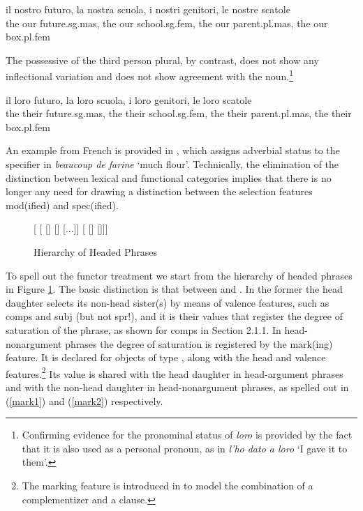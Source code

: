 \documentclass[output=paper]{langsci/langscibook}
\begin{document}
\begin{exe}  
\ex 
\gll  il nostro futuro, la nostra scuola, i nostri genitori, le nostre scatole \\
      the our future.{\sc sg.mas}, the our school.{\sc sg.fem}, the our parent.{\sc pl.mas}, the our box.{\sc pl.fem} \\ 
\end{exe} 

\noindent
The possessive of the third person plural, by contrast, does not show any 
inflectional variation and does not show agreement with the 
noun.\footnote{Confirming evidence for the pronominal status of \emph{loro} is 
provided by the fact that it is also used as a personal pronoun, as in 
\emph{l'ho dato a loro} `I gave it to them'.}

\begin{exe} 
\ex 
\gll  il loro futuro, la loro scuola, i loro genitori, le loro scatole \\   
      the their future.{\sc sg.mas}, the their school.{\sc sg.fem}, the their parent.{\sc pl.mas}, the their box.{\sc pl.fem} \\ 
\end{exe}

\noindent
An example from French is provided in \citet{Abeilleetal04}, 
which assigns adverbial status to the specifier in 
\emph{beaucoup de farine} `much flour'.  
Technically, the elimination of the distinction between lexical and 
functional categories implies that there is no longer any need for 
drawing a distinction between the selection features {\sc mod(ified)} and {\sc spec(ified)}. 

\begin{figure}
	\centering
	\begin{forest}
[
	[
		[]
		[]
		[...]]
	[
		[]
		[]]]	
	\end{forest}
	\caption{\label{typ} Hierarchy of Headed Phrases}
\end{figure}

To spell out the functor treatment we start from the 
hierarchy of headed phrases in Figure \ref{typ}. The basic distinction is
that between  and . 
In the former the head daughter selects its non-head sister(s) by means of 
valence features, such as {\sc comps} and {\sc subj} (but not {\sc spr}!), 
and it is their values that register the degree of saturation of the phrase, 
as shown for {\sc comps} in Section 2.1.1.  
In head-nonargument phrases the degree of saturation is registered  
by the {\sc mark(ing)} feature. It is declared for objects of type , 
along with the {\sc head} and valence features.\footnote{The {\sc marking} feature  
is introduced in \citet[46]{ps2} to model the combination of a complementizer 
and a clause.} Its value is shared with the head daughter in head-argument phrases
and with the non-head daughter in head-nonargument phrases, as spelled out in 
(\ref{mark1}) and (\ref{mark2}) respectively. 
\end{document}
